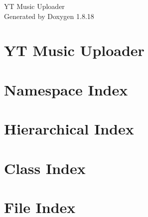 \let\mypdfximage\pdfximage\def\pdfximage{\immediate\mypdfximage}\documentclass[twoside]{book}
\newcommand{\+}{\discretionary{\mbox{\scriptsize$\hookleftarrow$}}{}{}}
\newcommand{\clearemptydoublepage}{%
  \newpage{\pagestyle{empty}\cleardoublepage}%
}
\begin{document}
\hypersetup{pageanchor=false,
             bookmarksnumbered=true,
             pdfencoding=unicode
            }
\begin{titlepage}
\vspace*{7cm}
\begin{center}%
{\Large YT Music Uploader }\\
\vspace*{1cm}
{\large Generated by Doxygen 1.8.18}\\
\end{center}
\end{titlepage}
\clearemptydoublepage
{}
\tableofcontents
\clearemptydoublepage
{}
\hypersetup{pageanchor=true}

\chapter{YT Music Uploader}
\label{index}\hypertarget{index}{}
\chapter{Namespace Index}

\chapter{Hierarchical Index}

\chapter{Class Index}

\chapter{File Index}

\end{document}

